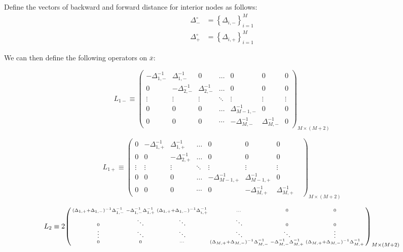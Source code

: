 \documentclass[11pt]{article}
\newcommand{\set}[1]{\ensuremath{\left\{{#1}\right\}}}
\newenvironment{psmallmatrix}
{\left(\begin{smallmatrix}}
	{\end{smallmatrix}\right)}
\theoremstyle{definition}
\begin{document}
Define the vectors of backward and forward distance for interior nodes as follows:
\begin{align}
\Delta_{-}^\circ &= \set{\Delta_{i,-}}_{i=1}^M \\
\Delta_{+}^\circ &= \set{\Delta_{i,+}}_{i=1}^M
\end{align}


We can then define the following operators on $\overline{x}$:


\begin{equation}\label{eq:L-1-minus-extended}
{L}_{1-} \equiv\begin{pmatrix}
-\Delta_{1,-}^{-1}&\Delta_{1,-}^{-1}&0&\dots&0&0&0\\
0&-\Delta_{2,-}^{-1}&\Delta_{2,-}^{-1}&\dots&0&0&0\\
\vdots&\vdots&\vdots&\ddots&\vdots&\vdots&\vdots\\
0&0&0&\dots&\Delta_{M-1,-}^{-1}&0&0\\
0&0&0&\cdots&-\Delta_{M,-}^{-1}&\Delta_{M,-}^{-1}&0
\end{pmatrix}_{M\times (M+2)}
\end{equation}

\begin{equation}\label{eq:L-1-plus-extended}
{L}_{1+} \equiv \begin{pmatrix}
0&-\Delta_{1,+}^{-1}&\Delta_{1,+}^{-1}&\dots&0&0&0\\
0&0&-\Delta_{2,+}^{-1}&\dots&0&0&0\\
\vdots&\vdots&\vdots&\ddots&\vdots&\vdots&\vdots\\
0&0&0&\dots&-\Delta_{M-1,+}^{-1}&\Delta_{M-1,+}^{-1}&0\\
0&0&0&\cdots&0&-\Delta_{M,+}^{-1}&\Delta_{M,+}^{-1}&
\end{pmatrix}_{M\times (M+2)}
\end{equation}


\begin{equation}\label{eq:L-2-extended} \small
{L}_2 \equiv 2 \begin{psmallmatrix}
(\Delta_{1,+}+\Delta_{1,-})^{-1}\Delta_{1,-}^{-1} &-\Delta_{1,-}^{-1} \Delta_{1,+}^{-1}  & (\Delta_{1,+}+\Delta_{1,-})^{-1} \Delta_{i,+}^{-1}&\dots&0&0\\
0 & \ddots & \ddots &\ddots & 0 & 0\\
\vdots&\ddots &\ddots & \ddots & \ddots & \vdots\\
0&0&\cdots&
(\Delta_{M,+}+\Delta_{M,-})^{-1}\Delta_{M,-}^{-1} &-\Delta_{M,-}^{-1} \Delta_{M,+}^{-1}  &
(\Delta_{M,+}+\Delta_{M,-})^{-1}\Delta_{M,+}^{-1}
\end{psmallmatrix}_{M\times (M+2)}
\end{equation}
\end{document}
